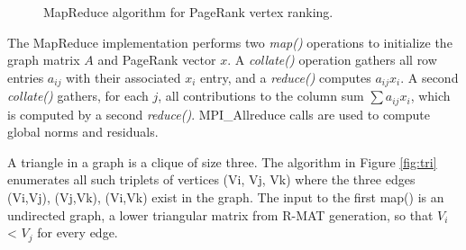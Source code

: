 \begin{figure}[htb]
 \begin{center}\end{center}

 \caption{MapReduce algorithm for PageRank vertex ranking.}

 \label{fig:pr}
\end{figure}

The MapReduce implementation performs two {\it map()} operations to
initialize the graph matrix $A$ and PageRank vector $x$.  A {\it
collate()} operation gathers all row entries $a_{ij}$ with their
associated $x_i$ entry, and a {\it reduce()} computes $a_{ij} x_i$.  A
second {\it collate()} gathers, for each $j$, all contributions to the
column sum $\sum a_{ij} x_i$, which is computed by a second {\it
reduce()}.  MPI\_Allreduce calls are used to compute global norms and
residuals.

A triangle in a graph is a clique of size three.  The algorithm in
Figure \ref{fig:tri} enumerates all such triplets of vertices (Vi, Vj,
Vk) where the three edges (Vi,Vj), (Vj,Vk), (Vi,Vk) exist in the
graph.  The input to the first map() is an undirected graph, a lower
triangular matrix from R-MAT generation, so that $V_i$ < $V_j$ for
every edge.

